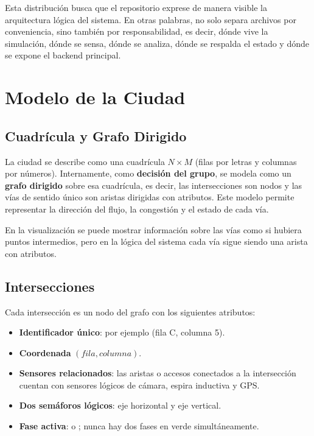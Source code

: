 \documentclass[12pt, a4paper]{article}
\let\oldtexttt\texttt
\renewcommand{\texttt}[1]{\oldtexttt{\seqsplit{#1}}}
\begin{document}
Esta distribución busca que el repositorio exprese de manera visible la arquitectura lógica del sistema. En otras palabras, no solo separa archivos por conveniencia, sino también por responsabilidad, es decir, dónde vive la simulación, dónde se sensa, dónde se analiza, dónde se respalda el estado y dónde se expone el backend principal.

\section{Modelo de la Ciudad}

\subsection{Cuadrícula y Grafo Dirigido}

La ciudad se describe como una cuadrícula $N\!\times\!M$ (filas por letras y columnas por números). Internamente, como \textbf{decisión del grupo}, se modela como un \textbf{grafo dirigido} sobre esa cuadrícula, es decir, las intersecciones son nodos y las vías de sentido único son aristas dirigidas con atributos. Este modelo permite representar la dirección del flujo, la congestión y el estado de cada vía.

En la visualización se puede mostrar información sobre las vías como si hubiera puntos intermedios, pero en la lógica del sistema cada vía sigue siendo una arista con atributos.

\subsection{Intersecciones}

Cada intersección es un nodo del grafo con los siguientes atributos:

\begin{itemize}
    \item \textbf{Identificador único}: por ejemplo \texttt{INT-C5} (fila C, columna 5).
    \item \textbf{Coordenada} $(fila, columna)$.
    \item \textbf{Sensores relacionados}: las aristas o accesos conectados a la intersección cuentan con sensores lógicos de cámara, espira inductiva y GPS.
    \item \textbf{Dos semáforos lógicos}: eje horizontal y eje vertical.
    \item \textbf{Fase activa}: \texttt{HORIZONTAL} o \texttt{VERTICAL}; nunca hay dos fases en verde simultáneamente.
\end{itemize}
\end{document}
